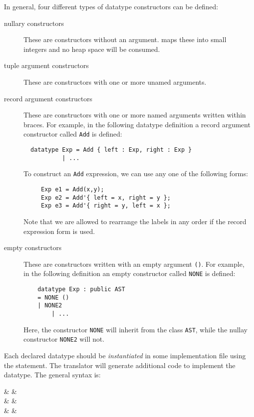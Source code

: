 In general, four different types of datatype constructors can be defined:
\begin{description}
 \item[nullary constructors]  These are constructors without an argument.
 \Prop{} maps these into small integers and no heap space will be consumed.
 \item[tuple argument constructors] These are constructors with one
 or more unamed arguments.  
 \item[record argument constructors] These are constructors with one
 or more named arguments written within braces.  For example, in the
 following datatype definition a record argument constructor called
 \verb|Add| is defined:
 \begin{verbatim}
  datatype Exp = Add { left : Exp, right : Exp }
	       | ...
 \end{verbatim}
  To construct an \verb|Add| expression, we can use any one of the following
  forms:
  \begin{verbatim}
     Exp e1 = Add(x,y);
     Exp e2 = Add'{ left = x, right = y };
     Exp e3 = Add'{ right = y, left = x };
  \end{verbatim}
  Note that we are allowed to rearrange the labels in any order if
  the record expression form is used.
 \item[empty constructors] These are constructors written with
 an empty argument \verb|()|.  For example, in the following definition
 an empty constructor called \verb|NONE| is defined:
 \begin{verbatim}
    datatype Exp : public AST
	= NONE ()
	| NONE2
        | ...
 \end{verbatim}
 Here, the constructor \verb|NONE| will inherit from the class \verb|AST|,
 while the nullay constructor \verb|NONE2| will not.
\end{description}


Each declared datatype should be {\em instantiated} in some implementation
file using the  statement.  The translator
will generate additional code to implement the datatype.  The general
syntax is:
\begin{syntax}
    & \IS &
         \\
    & \OR & 
           \\
  & \IS & \Id {} \\
\end{syntax}

